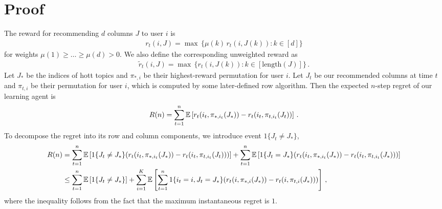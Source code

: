 
\clearpage
\onecolumn
\appendix

\section{Proof}
\label{sec:proof}

The reward for recommending $d$ columns $J$ to user $i$ is
\begin{align*}
  r_t(i, J) =
  \max \, \{\mu(k) \, r_t(i, J(k)): k \in [d]\}
\end{align*}
for weights $\mu(1) \geq \dots \geq \mu(d) > 0$. We also define the corresponding unweighted reward as
\begin{align*}
  \tilde{r}_t(i, J) =
  \max \, \{r_t(i, J(k)): k \in [\text{length}(J)]\}\,.
\end{align*}
Let $J_\ast$ be the indices of hott topics and $\pi_{\ast, i}$ be their highest-reward permutation for user $i$. Let $J_t$ be our recommended columns at time $t$ and $\pi_{t, i}$ be their permutation for user $i$, which is computed by some later-defined row algorithm. Then the expected $n$-step regret of our learning agent is
\begin{align*}
  R(n) =
  \sum_{t = 1}^n \mathbb{E}\left[r_t(i_t, \pi_{\ast, i_t}(J_\ast)) - r_t(i_t, \pi_{t, i_t}(J_t))\right]\,.
\end{align*}
To decompose the regret into its row and column components, we introduce event $1\{J_t \neq J_\ast\}$,
\begin{align*}
  R(n)
  & = \sum_{t = 1}^n \mathbb{E}\left[1\{J_t \neq J_\ast\} (r_t(i_t, \pi_{\ast, i_t}(J_\ast)) - r_t(i_t, \pi_{t, i_t}(J_t)))\right] +
  \sum_{t = 1}^n \mathbb{E}\left[1\{J_t = J_\ast\} (r_t(i_t, \pi_{\ast, i_t}(J_\ast)) - r_t(i_t, \pi_{t, i_t}(J_\ast)))\right] \\
  & \leq \sum_{t = 1}^n \mathbb{E}\left[1\{J_t \neq J_\ast\}\right] +
  \sum_{i = 1}^K \mathbb{E}\left[\sum_{t = 1}^n 1\{i_t = i, J_t = J_\ast\} (r_t(i, \pi_{\ast, i}(J_\ast)) - r_t(i, \pi_{t, i}(J_\ast)))\right]\,,
\end{align*}
where the inequality follows from the fact that the maximum instantaneous regret is $1$.


